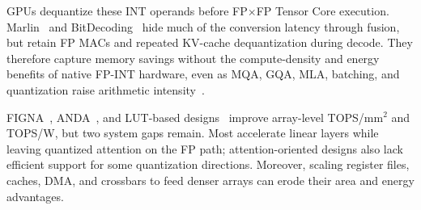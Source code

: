 \documentclass[sigconf,anonymous,nonacm]{acmart}
\newcommand{\fpint}{FP-INT}
\begin{document}



GPUs dequantize these INT operands before FP$\times$FP Tensor Core execution. Marlin~\cite{marlin} and BitDecoding~\cite{bitdecoding} hide much of the conversion latency through fusion, but retain FP MACs and repeated KV-cache dequantization during decode. They therefore capture memory savings without the compute-density and energy benefits of native \fpint{} hardware, even as MQA, GQA, MLA, batching, and quantization raise arithmetic intensity~\cite{mqa,gqa,deepseekai2024deepseekv2strongeconomicalefficient}.

FIGNA~\cite{figna}, ANDA~\cite{anda}, and LUT-based designs~\cite{figlut,lut_tensor_core} improve array-level TOPS/mm$^2$ and TOPS/W, but two system gaps remain. Most accelerate linear layers while leaving quantized attention on the FP path; attention-oriented designs also lack efficient support for some quantization directions. Moreover, scaling register files, caches, DMA, and crossbars to feed denser arrays can erode their area and energy advantages.
\end{document}
